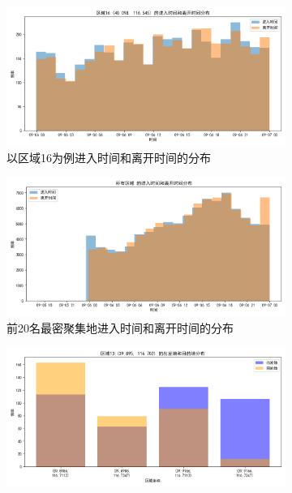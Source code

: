 \documentclass[UTF8]{ctexart}
\begin{document}
\begin{figure}[htb]
    \centering
    \begin{subfigure}[b]{0.48\textwidth}
        \centering
        \includegraphics[width=\textwidth]{../img/时序分布/区域16时间分布.png}
        \caption{以区域16为例进入时间和离开时间的分布}
        \label{insimple}
    \end{subfigure}
    \hfill
    \begin{subfigure}[b]{0.48\textwidth}
        \centering
        \includegraphics[width=\textwidth]{../img/时序分布/所有区域时间分布.png}
        \caption{前20名最密聚集地进入时间和离开时间的分布}
        \label{inall}
    \end{subfigure}
    \vfill
    \begin{subfigure}[b]{0.48\textwidth}
        \centering
        \includegraphics[width=\textwidth]{../img/OD分布/区域13出发地和目的地分布.png}

\end{subfigure}
\end{figure}
\end{document}
